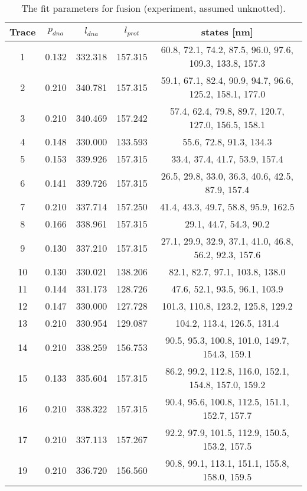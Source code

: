 \begin{table}
    \tiny
    \centering
    \caption{The fit parameters for fusion (experiment, assumed unknotted).}
    \label{tab:fusion-fit-parameters-exp-unknotted}
    \begin{tabular}{c|c|c|c|c}
        \textbf{Trace} & $p_{dna}$ & $l_{dna}$ & $l_{prot}$ & states [nm]\\\hline
        1 & 0.132 & 332.318 & 157.315 & 60.8, 72.1, 74.2, 87.5, 96.0, 97.6, 109.3, 133.8, 157.3\\
        2 & 0.210 & 340.781 & 157.315 & 59.1, 67.1, 82.4, 90.9, 94.7, 96.6, 125.2, 158.1, 177.0\\
        3 & 0.210 & 340.469 & 157.242 & 57.4, 62.4, 79.8, 89.7, 120.7, 127.0, 156.5, 158.1\\
        4 & 0.148 & 330.000 & 133.593 & 55.6, 72.8, 91.3, 134.3\\
        5 & 0.153 & 339.926 & 157.315 & 33.4, 37.4, 41.7, 53.9, 157.4\\
        6 & 0.141 & 339.726 & 157.315 & 26.5, 29.8, 33.0, 36.3, 40.6, 42.5, 87.9, 157.4\\
        7 & 0.210 & 337.714 & 157.250 & 41.4, 43.3, 49.7, 58.8, 95.9, 162.5\\
        8 & 0.166 & 338.961 & 157.315 & 29.1, 44.7, 54.3, 90.2\\
        9 & 0.130 & 337.210 & 157.315 & 27.1, 29.9, 32.9, 37.1, 41.0, 46.8, 56.2, 92.3, 157.6\\
        10 & 0.130 & 330.021 & 138.206 & 82.1, 82.7, 97.1, 103.8, 138.0\\
        11 & 0.144 & 331.173 & 128.726 & 47.6, 52.1, 93.5, 96.1, 103.9\\
        12 & 0.147 & 330.000 & 127.728 & 101.3, 110.8, 123.2, 125.8, 129.2\\
        13 & 0.210 & 330.954 & 129.087 & 104.2, 113.4, 126.5, 131.4\\
        14 & 0.210 & 338.259 & 156.753 & 90.5, 95.3, 100.8, 101.0, 149.7, 154.3, 159.1\\
        15 & 0.133 & 335.604 & 157.315 & 86.2, 99.2, 112.8, 116.0, 152.1, 154.8, 157.0, 159.2\\
        16 & 0.210 & 338.322 & 157.315 & 90.4, 95.6, 100.8, 112.5, 151.1, 152.7, 157.7\\
        17 & 0.210 & 337.113 & 157.267 & 92.2, 97.9, 101.5, 112.9, 150.5, 153.2, 157.5\\
        19 & 0.210 & 336.720 & 156.560 & 90.8, 99.1, 113.1, 151.1, 155.8, 158.0, 159.5\\
    \end{tabular}
\end{table}


